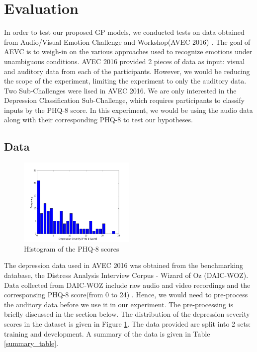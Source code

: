 \documentclass{article}
\begin{document}
	\section{Evaluation}
	In order to test our proposed GP models, we conducted tests on data obtained from Audio/Visual Emotion Challenge and Workshop(AVEC 2016) \cite{avec2016}. 
	The goal of AEVC is to weigh-in on the various approaches used to recognize emotions under unambiguous conditions. 
	AVEC 2016 provided 2 pieces of data as input: visual and auditory data from each of the participants. 
	However, we would be reducing the scope of the experiment, limiting the experiment to only the auditory data. Two Sub-Challenges were lised in AVEC 2016. 
	We are only interested in the Depression Classification Sub-Challenge, which requires participants to classify inputs by the PHQ-8 score. 
	In this experiment, we would be using the audio data along with their corresponding PHQ-8 to test our hypotheses.

	\subsection{Data}
	\begin{figure}[h]
	\center
 	\includegraphics[width=0.5\textwidth]{histogram_phq8}
	\caption{Histogram of the PHQ-8 scores}
	\label{histogram_phq8}
	\end{figure}
	
	The depression data used in AVEC 2016 was obtained from the benchmarking database, the Distress Analysis Interview Corpus - Wizard of Oz (DAIC-WOZ). 
	Data collected from DAIC-WOZ include raw audio and video recordings and the corresponsing PHQ-8 score(from 0 to 24) \cite{jad2008}. Hence, we would 
	need to pre-process the auditory data before we use it in our experiment. The pre-processing is briefly discussed in the section below.
	The distribution of the depression severity scores in the dataset is given in Figure \ref{histogram_phq8}. 
	The data provided are split into 2 sets: training and development.
	A summary of the data is given in Table \ref{summary_table}.
\end{document}
